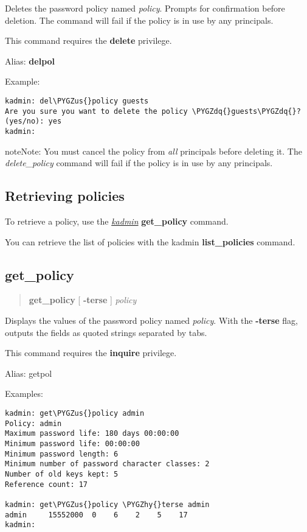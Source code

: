 \documentclass[letterpaper,10pt,english]{sphinxmanual}
\def\PYGZus{\char`\_}
\def\PYGZhy{\char`\-}
\def\PYGZdq{\char`\"}
\begin{document}
Deletes the password policy named \emph{policy}.  Prompts for confirmation
before deletion.  The command will fail if the policy is in use by any
principals.

This command requires the \textbf{delete} privilege.

Alias: \textbf{delpol}

Example:

\begin{Verbatim}[commandchars=\\\{\}]
kadmin: del\PYGZus{}policy guests
Are you sure you want to delete the policy \PYGZdq{}guests\PYGZdq{}?
(yes/no): yes
kadmin:
\end{Verbatim}

\begin{notice}{note}{Note:}
You must cancel the policy from \emph{all} principals before
deleting it.  The \emph{delete\_policy} command will fail if the policy
is in use by any principals.
\end{notice}


\subsection{Retrieving policies}
\label{admin/database:retrieving-policies}
To retrieve a policy, use the {\hyperref[admin/admin_commands/kadmin_local:kadmin-1]{\emph{kadmin}}} \textbf{get\_policy} command.

You can retrieve the list of policies with the kadmin
\textbf{list\_policies} command.


\subsection{get\_policy}
\label{admin/database:get-policy}\begin{quote}

\textbf{get\_policy} {[} \textbf{-terse} {]} \emph{policy}
\end{quote}

Displays the values of the password policy named \emph{policy}.  With the
\textbf{-terse} flag, outputs the fields as quoted strings separated by
tabs.

This command requires the \textbf{inquire} privilege.

Alias: getpol

Examples:

\begin{Verbatim}[commandchars=\\\{\}]
kadmin: get\PYGZus{}policy admin
Policy: admin
Maximum password life: 180 days 00:00:00
Minimum password life: 00:00:00
Minimum password length: 6
Minimum number of password character classes: 2
Number of old keys kept: 5
Reference count: 17

kadmin: get\PYGZus{}policy \PYGZhy{}terse admin
admin     15552000  0    6    2    5    17
kadmin:
\end{Verbatim}
\end{document}
